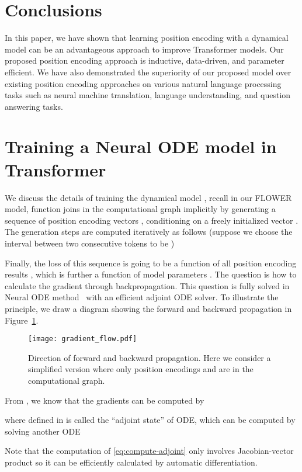 \documentclass[11pt]{article}
\begin{document}
\section{Conclusions}
In this paper, we have shown that learning position encoding with a dynamical model can be an advantageous approach to improve Transformer models. Our proposed position encoding approach is inductive, data-driven, and parameter efficient. We have also demonstrated the superiority of our proposed model over existing position encoding approaches on various natural language processing tasks such as neural machine translation, language understanding, and question answering tasks.




\appendix
\section{Training a Neural ODE model in Transformer}
We discuss the details of training the dynamical model , recall in our FLOWER model, function  joins in the computational graph implicitly by generating a sequence of position encoding vectors , conditioning on a freely initialized vector . The generation steps are computed iteratively as follows (suppose we choose the interval between two consecutive tokens to be ) 

Finally, the loss  of this sequence is going to be a function of all position encoding results , which is further a function of model parameters . The question is how to calculate the gradient  through backpropagation. This question is fully solved in Neural ODE method~\cite{chen2018neural} with an efficient adjoint ODE solver. To illustrate the principle, we draw a diagram showing the forward and backward propagation in Figure~\ref{fig:gradient-flow}.
\begin{figure}[htb]
    \centering
    \texttt{[image: gradient\_flow.pdf]}
    \caption{Direction of forward and backward propagation. Here we consider a simplified version where only position encodings  and  are in the computational graph.}
    \label{fig:gradient-flow}
\end{figure}

From \cite{chen2018neural}, we know that the gradients  can be computed by

where  defined in  is called the ``adjoint state'' of ODE, which can be computed by solving another ODE

Note that the computation of \eqref{eq:compute-adjoint} only involves Jacobian-vector product so it can be efficiently calculated by automatic differentiation.
\end{document}
